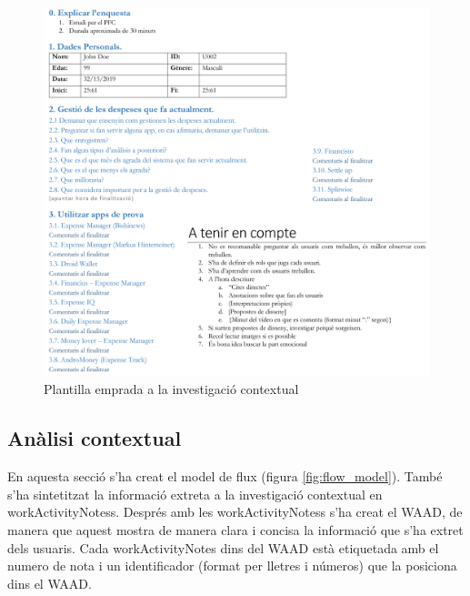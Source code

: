 \begin{figure}[htp]
\centering
\includegraphics[scale=0.65]{plantilla_analisi.png}
\caption{Plantilla emprada a la investigació contextual}\label{fig:plantilla_analisi}
\end{figure}

\subsection{Anàlisi contextual}
En aquesta secció s'ha creat el model de flux (figura \ref{fig:flow_model}). També s'ha sintetitzat la informació extreta a la investigació contextual en \glspl{workActivityNotes}. Després amb les \glspl{workActivityNotes} s'ha creat el \ac{WAAD}, de manera que aquest mostra de manera clara i concisa la informació que s'ha extret dels usuaris. Cada \gls{workActivityNotes} dins del \ac{WAAD} està etiquetada amb el numero de nota i un identificador (format per lletres i números) que la posiciona dins el \ac{WAAD}.


